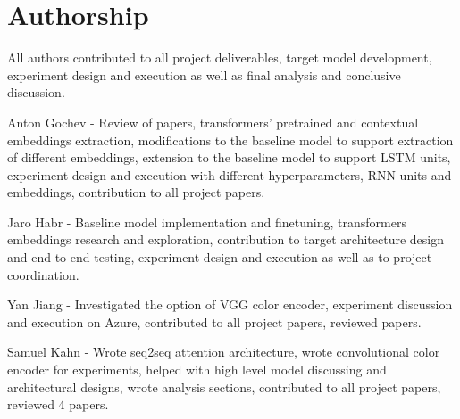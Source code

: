 \section*{Authorship}

All authors contributed to all project deliverables, target model development, experiment design and execution as well as final analysis and conclusive discussion.

Anton Gochev - Review of papers, transformers’ pretrained and contextual embeddings extraction, modifications to the baseline model to support extraction of different embeddings, extension to the baseline model to support LSTM units, experiment design and execution with different hyperparameters, RNN units and embeddings, contribution to all project papers.

Jaro Habr - Baseline model implementation and finetuning, transformers embeddings research and exploration, contribution to target architecture design and end-to-end testing, experiment design and execution as well as to project coordination.

Yan Jiang - Investigated the option of VGG color encoder, experiment discussion and execution on Azure, contributed to all project papers, reviewed papers.

Samuel Kahn - Wrote seq2seq attention architecture, wrote convolutional color encoder for experiments, helped with high level model discussing and architectural designs, wrote analysis sections, contributed to all project papers, reviewed 4 papers.
